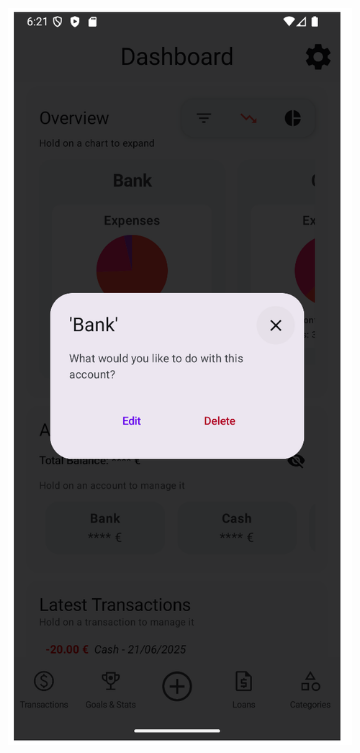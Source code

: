 \documentclass[a4paper,12pt]{article}
\begin{document}
\begin{figure}[H]
    \centering
    \begin{subfigure}[b]{0.23\textwidth}
        \includegraphics[width=\textwidth]{account_interaction_dialog.png}

\end{subfigure}
\end{figure}
\end{document}
